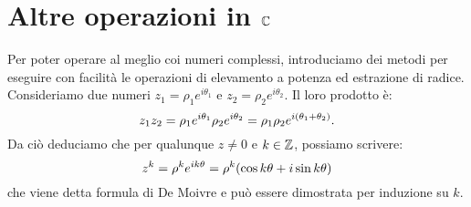    \section{Altre operazioni in $\mathbb{C}$}
        Per poter operare al meglio coi numeri complessi, introduciamo dei metodi per eseguire con facilit\`a le operazioni di elevamento a potenza ed estrazione di radice. Consideriamo due numeri $z_1=\rho_1e^{i\theta_1}$ e $z_2=\rho_2e^{i\theta_2}$. Il loro prodotto \`e: $$z_1z_2=\rho_1e^{i\theta_1}\rho_2e^{i\theta_2}=\rho_1\rho_2e^{i\qty(\theta_1+\theta_2)}.$$ Da ci\`o deduciamo che per qualunque $z\neq 0$ e $k\in\mathbb{Z}$, possiamo scrivere:
        \begin{equation}
            z^k=\rho^ke^{ik\theta}=\rho^k\qty(\cos k\theta+i\sin k\theta)
            \label{eq:demoivre}
        \end{equation}
        che viene detta formula di De Moivre e pu\`o essere dimostrata per induzione su $k$.
        
